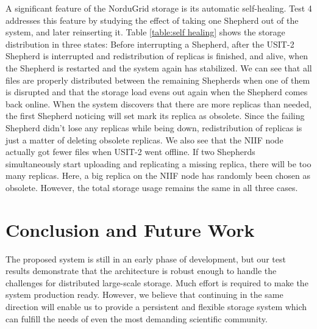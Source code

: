 \documentclass{llncs}
\begin{document}
A significant feature of the NorduGrid storage is its automatic self-healing. Test 4 addresses this feature by studying the effect of
taking one Shepherd out of the system, and later reinserting it. Table
\ref{table:self healing} shows the storage distribution in three
states: Before interrupting a Shepherd, after the USIT-2
Shepherd is interrupted and redistribution of replicas is finished, and
alive, when the Shepherd is restarted and the system again has stabilized. We
can see that all files are properly distributed between the remaining
Shepherds when one of them is disrupted and that the storage load evens out 
again when the Shepherd comes back online. When the
system discovers that there are more replicas than needed, the first
Shepherd noticing will set mark its replica as obsolete. Since the failing Shepherd didn't lose any replicas while
being down, redistribution of replicas is just a matter of deleting
obsolete replicas. We also see that the NIIF node actually got fewer
files when USIT-2 went offline. If two Shepherds simultaneously
start uploading and replicating a missing replica, there will be too many
replicas. Here, a big replica on the NIIF node has randomly been chosen as
obsolete. However, the total storage usage remains the same in all
three cases.

\section{Conclusion and Future Work}
\label{Conclusion and Future Work}

The proposed system is still in an early phase of development, but our test
results demonstrate that the architecture is robust enough to handle
the challenges for distributed large-scale storage. Much
effort is required to make the system production
ready. However, we believe that continuing in the same direction
will enable us to provide a persistent  and flexible storage system
which can fulfill the needs of even the most demanding scientific community. 
\end{document}
